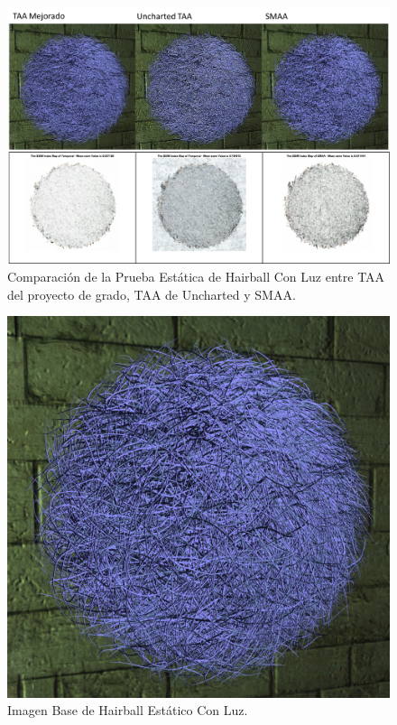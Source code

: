 \documentclass[pregrado]{tesis-usb} %
\begin{document}
\begin{figure}[!htb]
	\centering
	\includegraphics[scale=0.8]{images/results/hairball_static_lighted.png}
	\caption{Comparación de la Prueba Estática de Hairball Con Luz entre TAA del proyecto de grado, TAA de Uncharted y SMAA.}\label{fig:hairball_static_lighted_render}
\end{figure}

\begin{figure}[!htb]
	\centering
	\includegraphics[scale=0.2]{images/results/hairball_light_sobel_ground_truth.png}
	\caption{Imagen Base de Hairball Estático Con Luz.}\label{fig:hairball_static_lighted_truth}
\end{figure}
\end{document}
